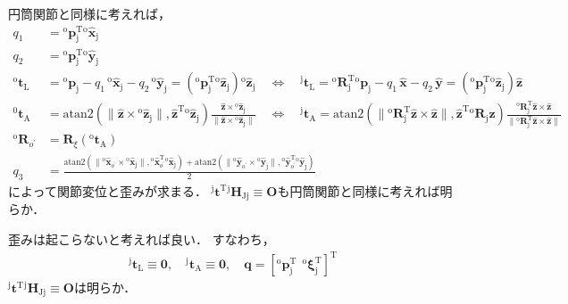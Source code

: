 ﻿\documentclass[a4paper]{jsarticle}
\begin{document}
円筒関節と同様に考えれば，
\begin{align*}
q_{1}&={}^{\mathrm{o}}\bm{p}_{\mathrm{j}}^{\mathrm{T}}{}^{\mathrm{o}}\hat{\bm{x}}_{\mathrm{j}}
\\
q_{2}&={}^{\mathrm{o}}\bm{p}_{\mathrm{j}}^{\mathrm{T}}{}^{\mathrm{o}}\hat{\bm{y}}_{\mathrm{j}}
\\
{}^{\mathrm{o}}\bm{t}_{\mathrm{L}}&={}^{\mathrm{o}}\bm{p}_{\mathrm{j}}
-q_{1}\,{}^{\mathrm{o}}\hat{\bm{x}}_{\mathrm{j}}
-q_{2}\,{}^{\mathrm{o}}\hat{\bm{y}}_{\mathrm{j}}
=
({}^{\mathrm{o}}\bm{p}_{\mathrm{j}}^{\mathrm{T}}{}^{\mathrm{o}}\hat{\bm{z}}_{\mathrm{j}})
{}^{\mathrm{o}}\hat{\bm{z}}_{\mathrm{j}}
\quad\Leftrightarrow\quad
{}^{\mathrm{j}}\bm{t}_{\mathrm{L}}
={}^{\mathrm{o}}\bm{R}_{\mathrm{j}}^{\mathrm{T}}{}^{\mathrm{o}}\bm{p}_{\mathrm{j}}
-q_{1}\,\hat{\bm{x}}
-q_{2}\,\hat{\bm{y}}
=
({}^{\mathrm{o}}\bm{p}_{\mathrm{j}}^{\mathrm{T}}{}^{\mathrm{o}}\hat{\bm{z}}_{\mathrm{j}})
\hat{\bm{z}}
\\
{}^{0}\bm{t}_{\mathrm{A}}
&=\mathrm{atan2}(\|\hat{\bm{z}}\times{}^{\mathrm{o}}\hat{\bm{z}}_{\mathrm{j}}\|,\hat{\bm{z}}^{\mathrm{T}}{}^{\mathrm{o}}\hat{\bm{z}}_{\mathrm{j}})
\frac{\hat{\bm{z}}\times{}^{\mathrm{o}}\hat{\bm{z}}_{\mathrm{j}}}{\|\hat{\bm{z}}\times{}^{\mathrm{o}}\hat{\bm{z}}_{\mathrm{j}}\|}
\quad\Leftrightarrow\quad
{}^{\mathrm{j}}\bm{t}_{\mathrm{A}}
=\mathrm{atan2}(\|{}^{\mathrm{o}}\bm{R}_{\mathrm{j}}^{\mathrm{T}}\hat{\bm{z}}\times\hat{\bm{z}}\|,\hat{\bm{z}}^{\mathrm{T}}{}^{\mathrm{o}}\bm{R}_{\mathrm{j}}\hat{\bm{z}})
\frac{{}^{\mathrm{o}}\bm{R}_{\mathrm{j}}^{\mathrm{T}}\hat{\bm{z}}\times\hat{\bm{z}}}
     {\|{}^{\mathrm{o}}\bm{R}_{\mathrm{j}}^{\mathrm{T}}\hat{\bm{z}}\times\hat{\bm{z}}\|}
\\
{}^{\mathrm{o}}\bm{R}_{o^{\prime}}&=\bm{R}_{\xi}({}^{\mathrm{o}}\bm{t}_{\mathrm{A}})
\\
q_{3}&=\frac{
 \mathrm{atan2}(\|{}^{\mathrm{o}}\hat{\bm{x}}_{o^{\prime}}\times{}^{\mathrm{o}}\hat{\bm{x}}_{\mathrm{j}}\|,
        {}^{\mathrm{o}}\hat{\bm{x}}_{o^{\prime}}^{\mathrm{T}}{}^{\mathrm{o}}\hat{\bm{x}}_{\mathrm{j}})
+\mathrm{atan2}(\|{}^{\mathrm{o}}\hat{\bm{y}}_{o^{\prime}}\times{}^{\mathrm{o}}\hat{\bm{y}}_{\mathrm{j}}\|,
        {}^{\mathrm{o}}\hat{\bm{y}}_{o^{\prime}}^{\mathrm{T}}{}^{\mathrm{o}}\hat{\bm{y}}_{\mathrm{j}})
 }{2}
\end{align*}
によって関節変位と歪みが求まる．
${}^{\mathrm{j}}\bm{t}^{\mathrm{T}}{}^{\mathrm{j}}\bm{H}_{\mathrm{Jj}}\equiv\bm{O}$も円筒関節と同様に考えれば明らか．



\vspace{\baselineskip}


歪みは起こらないと考えれば良い．
すなわち，
\begin{align*}
{}^{\mathrm{j}}\bm{t}_{\mathrm{L}}\equiv\bm{0},\quad
{}^{\mathrm{j}}\bm{t}_{\mathrm{A}}\equiv\bm{0},\quad
\bm{q}=[{}^{\mathrm{o}}\bm{p}_{\mathrm{j}}^{\mathrm{T}}~~{}^{\mathrm{o}}\bm{\xi}_{\mathrm{j}}^{\mathrm{T}}]^{\mathrm{T}}
\end{align*}
${}^{\mathrm{j}}\bm{t}^{\mathrm{T}}{}^{\mathrm{j}}\bm{H}_{\mathrm{Jj}}\equiv\bm{O}$は明らか．
\end{document}
